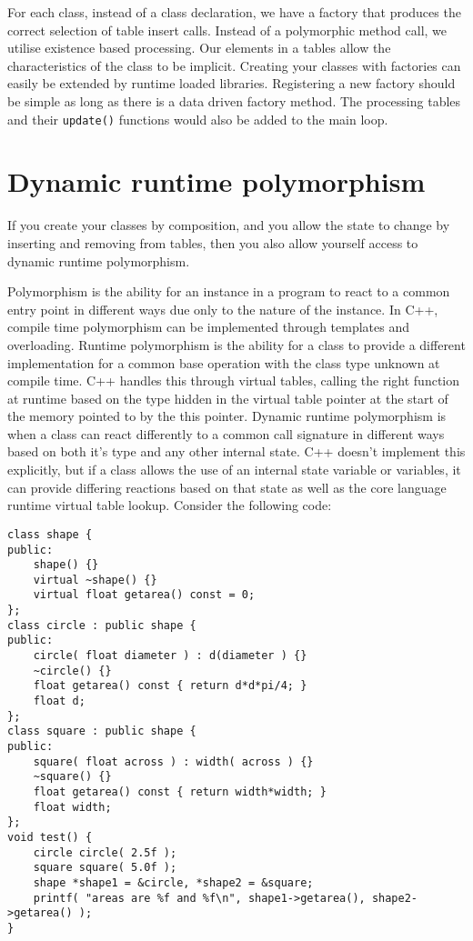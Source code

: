 For each class, instead of a class declaration, we have a factory that produces
the correct selection of table insert calls. Instead of a polymorphic method
call, we utilise existence based processing. Our elements in a tables allow the
characteristics of the class to be implicit. Creating your classes with
factories can easily be extended by runtime loaded libraries. Registering a new
factory should be simple as long as there is a data driven factory method. The
processing tables and their \texttt{update()} functions would also be added to
the main loop.

\section{Dynamic runtime polymorphism}\label{sec:exist-poly}

If you create your classes by composition, and you allow the state to change by
inserting and removing from tables, then you also allow yourself access to
dynamic runtime polymorphism.

Polymorphism is the ability for an instance in a program to react to a common
entry point in different ways due only to the nature of the instance. In C++,
compile time polymorphism can be implemented through templates and overloading.
Runtime polymorphism is the ability for a class to provide a different
implementation for a common base operation with the class type unknown at
compile time. C++ handles this through virtual tables, calling the right
function at runtime based on the type hidden in the virtual table pointer at
the start of the memory pointed to by the this pointer. Dynamic runtime
polymorphism is when a class can react differently to a common call signature
in different ways based on both it's type and any other internal state. C++
doesn't implement this explicitly, but if a class allows the use of an internal
state variable or variables, it can provide differing reactions based on that
state as well as the core language runtime virtual table lookup. Consider the
following code:

\begin{lstlisting}[caption=simple object-oriented shape code]
class shape {
public:
	shape() {}
	virtual ~shape() {}
	virtual float getarea() const = 0;
};
class circle : public shape {
public:
	circle( float diameter ) : d(diameter ) {}
	~circle() {}
	float getarea() const { return d*d*pi/4; }
	float d;
};
class square : public shape {
public:
	square( float across ) : width( across ) {}
	~square() {}
	float getarea() const { return width*width; }
	float width;
};
void test() {
	circle circle( 2.5f );
	square square( 5.0f );
	shape *shape1 = &circle, *shape2 = &square;
	printf( "areas are %f and %f\n", shape1->getarea(), shape2->getarea() );
}
\end{lstlisting}


